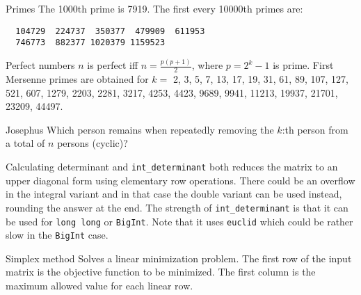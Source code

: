 \clearpage
{}
\categorycontents{}




\begin{algorithm}{Primes}
\desc
The 1000th prime is 7919. The first every 10000th primes are:
{\small
\begin{verbatim}
  104729  224737  350377  479909  611953
  746773  882377 1020379 1159523
\end{verbatim}
}\end{algorithm}




\begin{algorithm}{Perfect numbers}
\desc
$n$ is perfect iff $n = \frac{p(p+1)}{2}$, where $p = 2^k-1$ is prime.
First Mersenne primes are obtained for $k =$ 2, 3, 5, 7, 13, 17, 19,
31, 61, 89, 107, 127, 521, 607, 1279, 2203, 2281, 3217, 4253, 4423,
9689, 9941, 11213, 19937, 21701, 23209, 44497.
\end{algorithm}

\begin{algorithm}{Josephus}
\desc
Which person remains when repeatedly removing the $k$:th person from a
total of $n$ persons (cyclic)?
\end{algorithm}



\begin{algorithm}{Calculating determinant}
 and {\tt int\_determinant} both reduces the matrix
to an upper diagonal form using elementary row operations. There could be an
overflow in the integral variant and in that case the double variant
can be used instead, rounding the answer at the end. The strength of
{\tt int\_determinant} is that it can be used for {\tt long long} or
{\tt BigInt}. Note that it uses {\tt euclid} which could be rather
slow in the {\tt BigInt} case.
\end{algorithm}

\begin{algorithm}{Simplex method}
\desc
Solves a linear minimization problem. The first row of the
input matrix is the objective function to be minimized. The
first column is the maximum allowed value for each linear row.
\end{algorithm}




